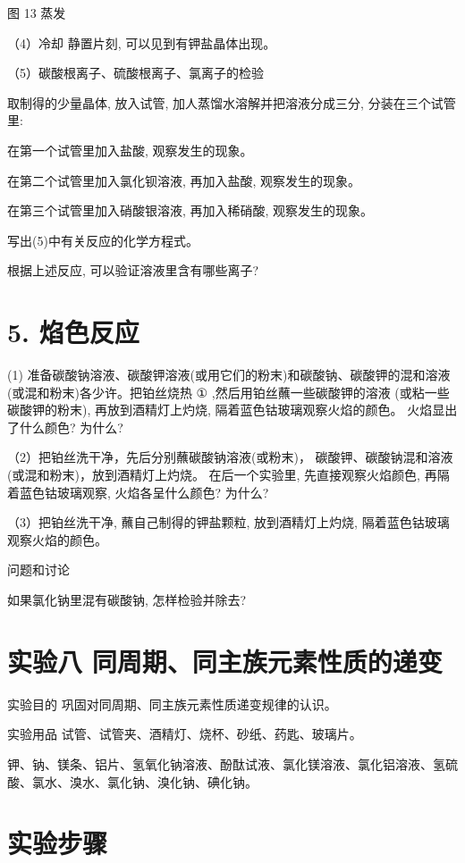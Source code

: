 \documentclass[10pt]{article}
\begin{document}
图 13 蒸发

（4）冷却 静置片刻, 可以见到有钾盐晶体出现。

（5）碳酸根离子、硫酸根离子、氯离子的检验

取制得的少量晶体, 放入试管, 加人蒸馏水溶解并把溶液分成三分, 分装在三个试管里:

在第一个试管里加入盐酸, 观察发生的现象。

在第二个试管里加入氯化钡溶液, 再加入盐酸, 观察发生的现象。

在第三个试管里加入硝酸银溶液, 再加入稀硝酸, 观察发生的现象。

写出(5)中有关反应的化学方程式。

根据上述反应, 可以验证溶液里含有哪些离子?

\section*{5. 焰色反应}

(1) 准备碳酸钠溶液、碳酸钾溶液(或用它们的粉末)和碳酸钠、碳酸钾的混和溶液(或混和粉末)各少许。把铂丝烧热 \(\text{①}\) ,然后用铂丝蘸一些碳酸钾的溶液 (或粘一些碳酸钾的粉末), 再放到酒精灯上灼烧, 隔着蓝色钴玻璃观察火焰的颜色。 火焰显出了什么颜色? 为什么?

（2）把铂丝洗干净，先后分别蘸碳酸钠溶液(或粉末)， 碳酸钾、碳酸钠混和溶液(或混和粉末)，放到酒精灯上灼烧。 在后一个实验里, 先直接观察火焰颜色, 再隔着蓝色钴玻璃观察, 火焰各呈什么颜色? 为什么?

（3）把铂丝洗干净, 蘸自己制得的钾盐颗粒, 放到酒精灯上灼烧, 隔着蓝色钴玻璃观察火焰的颜色。

问题和讨论

如果氯化钠里混有碳酸钠, 怎样检验并除去?

\section*{实验八 同周期、同主族元素性质的递变}

实验目的 巩固对同周期、同主族元素性质递变规律的认识。

实验用品 试管、试管夹、酒精灯、烧杯、砂纸、药匙、玻璃片。

钾、钠、镁条、铝片、氢氧化钠溶液、酚酞试液、氯化镁溶液、氯化铝溶液、氢硫酸、氯水、溴水、氯化钠、溴化钠、碘化钠。

\section*{实验步骤}
\end{document}
